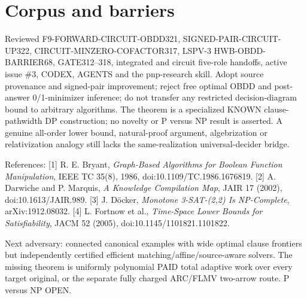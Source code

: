 \documentclass[11pt]{article}
\begin{document}
\section{Corpus and barriers}
\noindent Reviewed F9-FORWARD-CIRCUIT-OBDD321, SIGNED-PAIR-CIRCUIT-UP322, CIRCUIT-MINZERO-COFACTOR317, LSPV-3 HWB-OBDD-BARRIER68, GATE312--318, integrated and circuit five-role handoffs, active issue \#3, CODEX, AGENTS and the pnp-research skill. Adopt source provenance and signed-pair improvement; reject free optimal OBDD and post-answer 0/1-minimizer inference; do not transfer any restricted decision-diagram bound to arbitrary algorithms. The theorem is a specialized KNOWN clause-pathwidth DP construction; no novelty or P versus NP result is asserted. A genuine all-order lower bound, natural-proof argument, algebrization or relativization analogy still lacks the same-realization universal-decider bridge.

\noindent References: [1] R. E. Bryant, \emph{Graph-Based Algorithms for Boolean Function Manipulation}, IEEE TC 35(8), 1986, doi:10.1109/TC.1986.1676819. [2] A. Darwiche and P. Marquis, \emph{A Knowledge Compilation Map}, JAIR 17 (2002), doi:10.1613/JAIR.989. [3] J. D\"ocker, \emph{Monotone 3-SAT-(2,2) Is NP-Complete}, arXiv:1912.08032. [4] L. Fortnow et al., \emph{Time-Space Lower Bounds for Satisfiability}, JACM 52 (2005), doi:10.1145/1101821.1101822.

\noindent Next adversary: connected canonical examples with wide optimal clause frontiers but independently certified efficient matching/affine/source-aware solvers. The missing theorem is uniformly polynomial PAID total adaptive work over every target original, or the separate fully charged ARC/FLMV two-arrow route. P versus NP OPEN.
\end{document}
